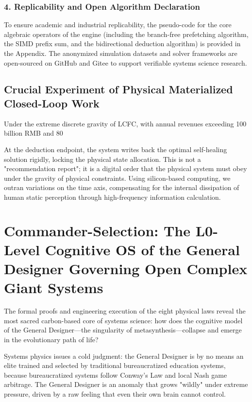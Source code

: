 \documentclass[11pt,a4paper]{article}
\begin{document}
\subsubsection*{4. Replicability and Open Algorithm Declaration}
To ensure academic and industrial replicability, the pseudo-code for the core algebraic operators of the engine (including the branch-free prefetching algorithm, the SIMD prefix sum, and the bidirectional deduction algorithm) is provided in the Appendix. The anonymized simulation datasets and solver frameworks are open-sourced on GitHub and Gitee to support verifiable systems science research.

\subsection{Crucial Experiment of Physical Materialized Closed-Loop Work}
Under the extreme discrete gravity of LCFC, with annual revenues exceeding 100 billion RMB and 80%

At the deduction endpoint, the system writes back the optimal self-healing solution rigidly, locking the physical state allocation. This is not a "recommendation report"; it is a digital order that the physical system must obey under the gravity of physical constraints. Using silicon-based computing, we outran variations on the time axis, compensating for the internal dissipation of human static perception through high-frequency information calculation.

\section{Commander-Selection: The L0-Level Cognitive OS of the General Designer Governing Open Complex Giant Systems}

The formal proofs and engineering execution of the eight physical laws reveal the most sacred carbon-based core of systems science: how does the cognitive model of the General Designer—the singularity of metasynthesis—collapse and emerge in the evolutionary path of life?

Systems physics issues a cold judgment: the General Designer is by no means an elite trained and selected by traditional bureaucratized education systems, because bureaucratized systems follow Conway's Law and local Nash game arbitrage. The General Designer is an anomaly that grows "wildly" under extreme pressure, driven by a raw feeling that even their own brain cannot control.
\end{document}
